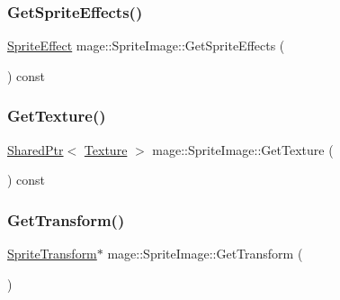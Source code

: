 \hypertarget{classmage_1_1_sprite_image_a3d6d121e19cffd5018fe1da305cba04d}{}\label{classmage_1_1_sprite_image_a3d6d121e19cffd5018fe1da305cba04d} 
\subsubsection{\texorpdfstring{Get\+Sprite\+Effects()}{GetSpriteEffects()}}
{\footnotesize\ttfamily \hyperlink{namespacemage_a9cfe18123066ba4236f548f9de75d881}{Sprite\+Effect} mage\+::\+Sprite\+Image\+::\+Get\+Sprite\+Effects (\begin{DoxyParamCaption}{ }\end{DoxyParamCaption}) const}

\hypertarget{classmage_1_1_sprite_image_a3c04fb68baaf44e4ee8beb08aff26f35}{}\label{classmage_1_1_sprite_image_a3c04fb68baaf44e4ee8beb08aff26f35} 
\subsubsection{\texorpdfstring{Get\+Texture()}{GetTexture()}}
{\footnotesize\ttfamily \hyperlink{namespacemage_a1e01ae66713838a7a67d30e44c67703e}{Shared\+Ptr}$<$ \hyperlink{classmage_1_1_texture}{Texture} $>$ mage\+::\+Sprite\+Image\+::\+Get\+Texture (\begin{DoxyParamCaption}{ }\end{DoxyParamCaption}) const}

\hypertarget{classmage_1_1_sprite_image_ab39404c038dde5b6ba6c05df35f80b48}{}\label{classmage_1_1_sprite_image_ab39404c038dde5b6ba6c05df35f80b48} 
\subsubsection{\texorpdfstring{Get\+Transform()}{GetTransform()}\hspace{0.1cm}{\footnotesize\ttfamily [1/2]}}
{\footnotesize\ttfamily \hyperlink{structmage_1_1_sprite_transform}{Sprite\+Transform}$\ast$ mage\+::\+Sprite\+Image\+::\+Get\+Transform (\begin{DoxyParamCaption}{ }\end{DoxyParamCaption})}

